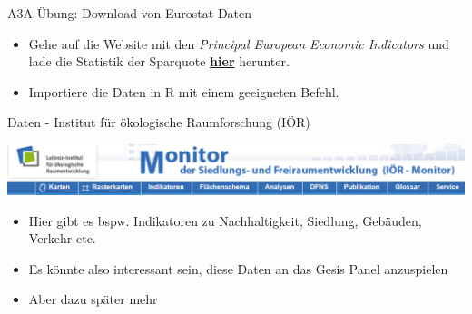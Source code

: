 \documentclass[ignorenonframetext,]{beamer}
\providecommand{\tightlist}{%
  \setlength{\itemsep}{0pt}\setlength{\parskip}{0pt}}
\begin{document}
\begin{frame}{A3A Übung: Download von Eurostat Daten}
\protect\hypertarget{a3a-ubung-download-von-eurostat-daten}{}

\begin{itemize}
\tightlist
\item
  Gehe auf die Website mit den \emph{Principal European Economic
  Indicators} und lade die Statistik der Sparquote
  \href{http://ec.europa.eu/eurostat/web/euro-indicators/peeis}{\textbf{hier}}
  herunter.
\item
  Importiere die Daten in R mit einem geeigneten Befehl.
\end{itemize}

\end{frame}

\begin{frame}{Daten - Institut für ökologische Raumforschung (IÖR)}
\protect\hypertarget{daten---institut-fur-okologische-raumforschung-ior}{}

\includegraphics{figure/ioerMonitor.PNG}

\begin{itemize}
\tightlist
\item
  Hier gibt es bspw. Indikatoren zu Nachhaltigkeit, Siedlung, Gebäuden,
  Verkehr etc.
\item
  Es könnte also interessant sein, diese Daten an das Gesis Panel
  anzuspielen
\item
  Aber dazu später mehr
\end{itemize}

\end{frame}
\end{document}
